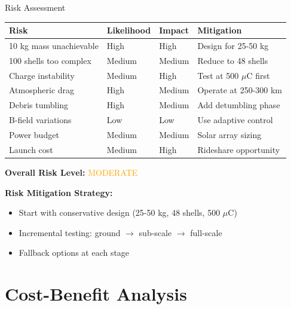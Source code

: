 \documentclass[11pt]{beamer}
\begin{document}
\begin{frame}{Risk Assessment}

\begin{table}[h]
\centering
\footnotesize
\begin{tabular}{llll}
\toprule
\textbf{Risk} & \textbf{Likelihood} & \textbf{Impact} & \textbf{Mitigation} \\
\midrule
10 kg mass unachievable & High & High & Design for 25-50 kg \\
100 shells too complex & Medium & Medium & Reduce to 48 shells \\
Charge instability & Medium & High & Test at 500 $\mu$C first \\
Atmospheric drag & High & Medium & Operate at 250-300 km \\
Debris tumbling & High & Medium & Add detumbling phase \\
B-field variations & Low & Low & Use adaptive control \\
Power budget & Medium & Medium & Solar array sizing \\
Launch cost & Medium & High & Rideshare opportunity \\
\bottomrule
\end{tabular}
\end{table}

\vspace{0.3cm}

\textbf{Overall Risk Level:} \textcolor{orange}{MODERATE}

\textbf{Risk Mitigation Strategy:}
\begin{itemize}
\item Start with conservative design (25-50 kg, 48 shells, 500 $\mu$C)
\item Incremental testing: ground $\rightarrow$ sub-scale $\rightarrow$ full-scale
\item Fallback options at each stage
\end{itemize}

\end{frame}

\section{Cost-Benefit Analysis}
\end{document}
